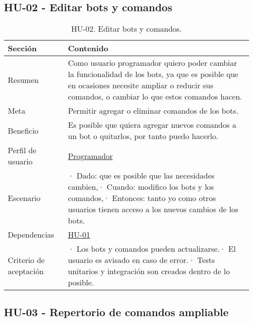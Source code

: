 \subsection{HU-02 - Editar bots y comandos}
\label{sec:hu02}

\FloatBarrier
\begin{table}[h]
    \centering
    \def\arraystretch{1.25}
    \begin{adjustbox}{max width=\textwidth}
    \begin{tabularx}{\textwidth}{|l|L|}
    \hline
        \textbf{Sección} & \textbf{Contenido} \\ \hline
    \hline
        Resumen & Como usuario programador quiero poder cambiar la funcionalidad de los bots, ya que es posible que en ocasiones necesite ampliar o reducir sus comandos, o cambiar lo que estos comandos hacen. \\ \hline
        Meta & Permitir agregar o eliminar comandos de los bots. \\ \hline
        Beneficio & Es posible que quiera agregar nuevos comandos a un bot o quitarlos, por tanto puedo hacerlo.  \\ \hline
        Perfil de usuario & \hyperref[sec:personaProgramador]{Programador} \\ \hline
        Escenario & · Dado: que es posible que las necesidades cambien,\linebreak · Cuando: modifico los bots y los comandos,\linebreak · Entonces: tanto yo como otros usuarios tienen acceso a los nuevos cambios de los bots. \\ \hline
        Dependencias & \hyperref[sec:hu01]{HU-01} \\ \hline
        Criterio de aceptación & · Los bots y comandos pueden actualizarse.\linebreak · El usuario es avisado en caso de error.\linebreak · Tests unitarios y integración son creados dentro de lo posible. \\ \hline
    \end{tabularx}
    \end{adjustbox}
    \caption{HU-02. Editar bots y comandos.}
\end{table}
\FloatBarrier

\bigskip
\bigskip
\bigskip
\bigskip
\bigskip
\bigskip
\bigskip
\bigskip
\pagebreak

\subsection{HU-03 - Repertorio de comandos ampliable}
\label{sec:hu03}

